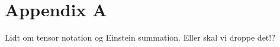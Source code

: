 \section{Appendix A}

Lidt om tensor notation og Einstein summation. Eller skal vi droppe det!?

\clearpage
